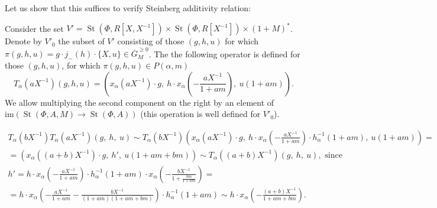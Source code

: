\documentclass[oneside, 8pt]{amsart}
\theoremstyle{remark}
\theoremstyle{definition}
\DeclareMathOperator{\St}{St}
\numberwithin{equation}{section}
\begin{document}
Let us show that this suffices to verify Steinberg additivity relation:

Consider the set $V' = \St(\Phi, R[X, X^{-1}]) \times \St(\Phi, R[X^{-1}]) \times (1 + M)^*$.
Denote by $V'_0$ the subset of $V'$ consisting of those $(g, h, u)$ for which $\pi(g, h, u) = g \cdot j_-(h) \cdot \{ X, u \} \in \overline{G}_M^{\geq 0}$.
The the following operator is defined for those $(g, h, u)$, for which $\pi(g, h, u) \in P(\alpha, m)$
\[ T_\alpha(aX^{-1})(g, h, u) = \left( x_\alpha(aX^{-1})\cdot g ,\
                                         h \cdot x_\alpha\left(-\frac{aX^{-1}}{1 + am}\right),\ 
                                         u(1 + am)\right).\]
We allow multiplying the second component on the right by an element of $\mathrm{im}(\St(\Phi, A, M) \to \St(\Phi, A))$
 (this operation is well defined for $V'_0$).

\begin{multline}
 T_\alpha(bX^{-1}) T_\alpha(aX^{-1}) \left(g,\ h,\ u\right) \sim
T_\alpha(bX^{-1}) \left(x_\alpha(aX^{-1})\cdot g,\ h \cdot x_\alpha\left(-\frac{aX^{-1}}{1 + am}\right) \cdot h^{-1}_\alpha(1 + am),\ u(1 + am)\right) = \\
 = \left( x_\alpha\left((a+b)X^{-1}\right)\cdot g,\ h',\ u(1 + am + bm) \right) \sim T_\alpha((a+b)X^{-1}) \left( g,\ h,\ u\right),\text{ since} \end{multline} 
 \begin{multline}
h' = h \cdot x_\alpha\left(-\frac{aX^{-1}}{1+am}\right) \cdot h^{-1}_\alpha(1+am) \cdot x_\alpha\left(-\frac{bX^{-1}}{1 + \frac{bm}{1+am}}\right) = \\ = 
 h \cdot x_\alpha\left(- \frac{aX^{-1}}{1 + am} - \frac{bX^{-1}}{(1+am)(1 + am + bm)}\right) \cdot h^{-1}_\alpha(1+am) \sim  
  h \cdot x_\alpha\left(- \frac{(a+b)X^{-1}}{1 + am + bm}\right).
\end{multline}
\end{document}
